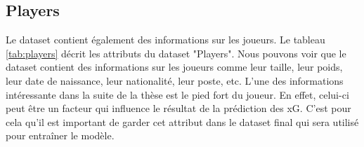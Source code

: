 \documentclass[12pt]{article}
\begin{document}
\newpage
\subsection{Players}
Le dataset contient également des informations sur les joueurs.
Le tableau \ref{tab:players} décrit les attributs du dataset "Players".
\newline\newline
Nous pouvons voir que le dataset contient des informations sur les joueurs comme leur taille, leur poids, leur date de naissance, leur nationalité, leur poste, etc.
L'une des informations intéressante dans la suite de la thèse est le pied fort du joueur.
En effet, celui-ci peut être un facteur qui influence le résultat de la prédiction des xG.
C'est pour cela qu'il est important de garder cet attribut dans le dataset final qui sera utilisé pour entraîner le modèle.
\end{document}
